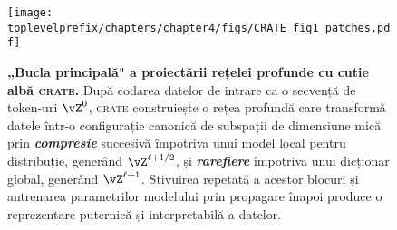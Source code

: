 \documentclass[../../book-main_ro.tex]{subfiles}
\begin{document}
\begin{figure}[t!]
     \centering
         \texttt{[image: \\toplevelprefix/chapters/chapter4/figs/CRATE\_fig1\_patches.pdf]}
     \vspace{-0.1in}
     \caption{
     \textbf{„Bucla principală" a proiectării rețelei profunde cu cutie albă \textsc{crate}.}
     După codarea datelor de intrare ca o secvență de token-uri $\vZ^0$, \textsc{crate} construiește o rețea profundă care transformă datele într-o configurație canonică de subspații de dimensiune mică prin {\textit{\textbf{compresie}}} succesivă
     împotriva unui model local pentru distribuție, generând $\vZ^{\ell+1/2}$, și {\textit{\textbf{rarefiere}}}
     împotriva unui dicționar global, generând $\vZ^{\ell+1}$.
     Stivuirea repetată a acestor blocuri și antrenarea parametrilor modelului prin propagare înapoi produce o reprezentare puternică și interpretabilă a datelor.
     }
        \label{fig:crate-diagram}
\end{figure}
\end{document}
